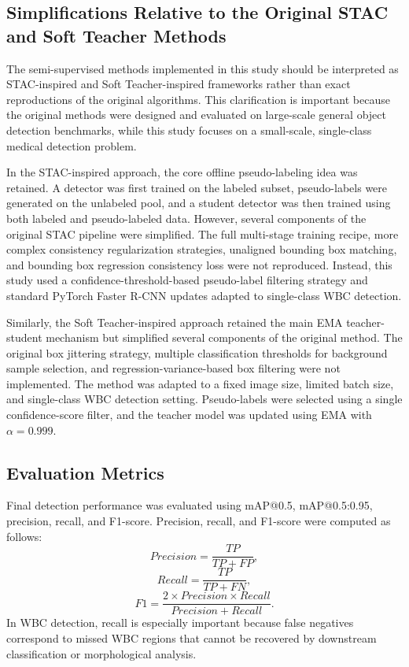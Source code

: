 \documentclass[conference,a4paper]{IEEEtran}
\begin{document}
\subsection{Simplifications Relative to the Original STAC and Soft Teacher Methods}
The semi-supervised methods implemented in this study should be interpreted as STAC-inspired and Soft Teacher-inspired frameworks rather than exact reproductions of the original algorithms. This clarification is important because the original methods were designed and evaluated on large-scale general object detection benchmarks, while this study focuses on a small-scale, single-class medical detection problem.

In the STAC-inspired approach, the core offline pseudo-labeling idea was retained. A detector was first trained on the labeled subset, pseudo-labels were generated on the unlabeled pool, and a student detector was then trained using both labeled and pseudo-labeled data. However, several components of the original STAC pipeline were simplified. The full multi-stage training recipe, more complex consistency regularization strategies, unaligned bounding box matching, and bounding box regression consistency loss were not reproduced. Instead, this study used a confidence-threshold-based pseudo-label filtering strategy and standard PyTorch Faster R-CNN updates adapted to single-class WBC detection.

Similarly, the Soft Teacher-inspired approach retained the main EMA teacher-student mechanism but simplified several components of the original method. The original box jittering strategy, multiple classification thresholds for background sample selection, and regression-variance-based box filtering were not implemented. The method was adapted to a fixed image size, limited batch size, and single-class WBC detection setting. Pseudo-labels were selected using a single confidence-score filter, and the teacher model was updated using EMA with $\alpha=0.999$.

\subsection{Evaluation Metrics}
Final detection performance was evaluated using mAP@0.5, mAP@0.5:0.95, precision, recall, and F1-score. Precision, recall, and F1-score were computed as follows:
\begin{equation}
Precision = \frac{TP}{TP + FP},
\end{equation}
\begin{equation}
Recall = \frac{TP}{TP + FN},
\end{equation}
\begin{equation}
F1 = \frac{2 \times Precision \times Recall}{Precision + Recall}.
\end{equation}
In WBC detection, recall is especially important because false negatives correspond to missed WBC regions that cannot be recovered by downstream classification or morphological analysis.
\end{document}
